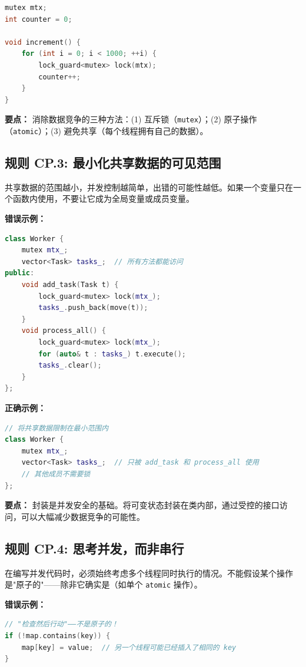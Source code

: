 \begin{lstlisting}[language=C++]
mutex mtx;
int counter = 0;

void increment() {
    for (int i = 0; i < 1000; ++i) {
        lock_guard<mutex> lock(mtx);
        counter++;
    }
}
\end{lstlisting}

\textbf{要点：} 消除数据竞争的三种方法：(1) 互斥锁（\texttt{mutex}）；(2) 原子操作（\texttt{atomic}）；(3) 避免共享（每个线程拥有自己的数据）。

\subsection*{\textbf{规则 CP.3:} 最小化共享数据的可见范围}

共享数据的范围越小，并发控制越简单，出错的可能性越低。如果一个变量只在一个函数内使用，不要让它成为全局变量或成员变量。

\textbf{错误示例：}

\begin{lstlisting}[language=C++]
class Worker {
    mutex mtx_;
    vector<Task> tasks_;  // 所有方法都能访问
public:
    void add_task(Task t) {
        lock_guard<mutex> lock(mtx_);
        tasks_.push_back(move(t));
    }
    void process_all() {
        lock_guard<mutex> lock(mtx_);
        for (auto& t : tasks_) t.execute();
        tasks_.clear();
    }
};
\end{lstlisting}

\textbf{正确示例：}

\begin{lstlisting}[language=C++]
// 将共享数据限制在最小范围内
class Worker {
    mutex mtx_;
    vector<Task> tasks_;  // 只被 add_task 和 process_all 使用
    // 其他成员不需要锁
};
\end{lstlisting}

\textbf{要点：} 封装是并发安全的基础。将可变状态封装在类内部，通过受控的接口访问，可以大幅减少数据竞争的可能性。

\subsection*{\textbf{规则 CP.4:} 思考并发，而非串行}

在编写并发代码时，必须始终考虑多个线程同时执行的情况。不能假设某个操作是"原子的"——除非它确实是（如单个 \texttt{atomic} 操作）。

\textbf{错误示例：}

\begin{lstlisting}[language=C++]
// "检查然后行动"——不是原子的！
if (!map.contains(key)) {
    map[key] = value;  // 另一个线程可能已经插入了相同的 key
}
\end{lstlisting}

